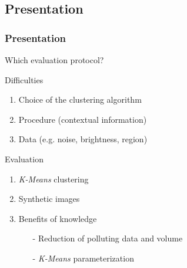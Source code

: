 \subsection[Presentation]{Presentation}
	\begin{frame}
	\frametitle{Presentation}
		\center \alert{Which evaluation protocol?}
		\begin{block}{Difficulties}
			\begin{enumerate}
				\item Choice of the clustering algorithm
				\item Procedure (contextual information)
				\item Data (e.g. noise, brightness, region)
			\end{enumerate}		
		\end{block}\vspace{1em}

		\begin{alertblock}{Evaluation}
			\begin{enumerate}
				\item \emph{K-Means} clustering	%
				\item Synthetic images %
				\item Benefits of knowledge %
				\begin{enumerate}
					\item[-] Reduction of polluting data and volume
					\item[-] \emph{K-Means} parameterization 
				\end{enumerate}
			\end{enumerate}		
		\end{alertblock}

%				
	\end{frame}


